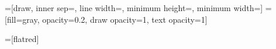 \newlength{\logentryinnersep}
\setlength{\logentryinnersep}{2pt}
\newlength{\logentrylinewidth}
\setlength{\logentrylinewidth}{1pt}
\newlength{\logentrywidth}
\newcommand{\logindexcolor}{flatred}
\newcommand{\cmdi}{$a \gets 0$}
\newcommand{\cmdii}{$b \gets 0$}
\newcommand{\cmdiii}{$a \gets b$}

=[draw,
                      inner sep=\logentryinnersep,
                      line width=\logentrylinewidth,
                      minimum height=\logentrywidth,
                      minimum width=\logentrywidth]
=[fill=gray, opacity=0.2, draw opacity=1, text opacity=1]

=[\logindexcolor]

\newcommand{\rightof}[1]{-\logentrylinewidth of #1}

\newcommand{\multipaxoslog}[6]{%
  \node[logentry, label={[logindex]90:0}, #2] (0) {#1};
  \node[logentry, label={[logindex]90:1}, right=\rightof{0}, #4] (1) {#3};
  \node[logentry, label={[logindex]90:2}, right=\rightof{1}, #6] (2) {#5};
}

